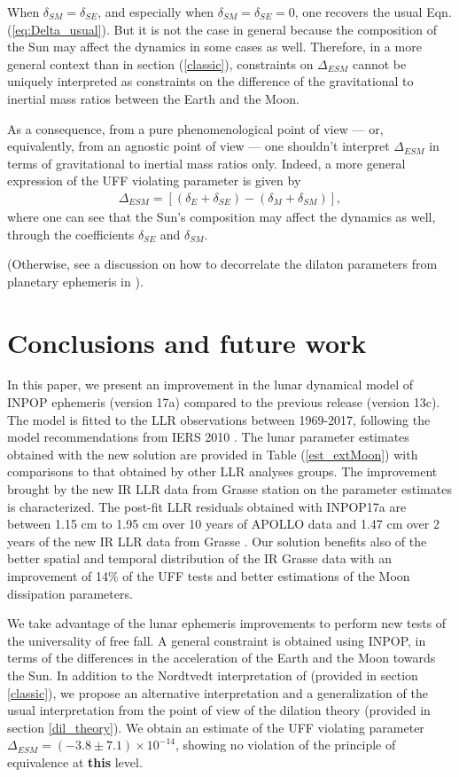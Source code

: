 \documentclass[fleqn,usenatbib,referee]{mnras}
\begin{document}
When $\delta_{SM}=\delta_{SE}$, and especially when $\delta_{SM}=\delta_{SE}=0$, one recovers the usual Eqn. (\ref{eq:Delta_usual}). But it is not the case in general because the composition of the Sun may affect the dynamics in some cases as well. Therefore, in a more general context than in section (\ref{classic}), constraints on $\Delta_{ESM}$ cannot be uniquely interpreted as constraints on the difference of the gravitational to inertial mass ratios between the Earth and the Moon. 

As a consequence, from a pure phenomenological point of view --- or, equivalently, from an agnostic point of view --- one shouldn't interpret $\Delta_{ESM}$ in terms of gravitational to inertial mass ratios only. Indeed, a more general expression of the UFF violating parameter is given by
\begin{eqnarray}
\Delta_{ESM} =\left[(\delta_E+\delta_{SE})- (\delta_M+\delta_{SM}) \right],\label{eq:Delta_dilaton}
\end{eqnarray}
where one can see that the Sun's composition may affect the dynamics as well, through the coefficients $\delta_{SE}$ and $\delta_{SM}$. 

(Otherwise, see a discussion on how to decorrelate the dilaton parameters from planetary ephemeris in \cite[]{2017arXiv170505244M}).


\section{Conclusions and future work}
In this paper, we present an improvement in the lunar dynamical model of INPOP ephemeris (version 17a) compared to the previous release (version 13c). The model is fitted to the LLR observations between 1969-2017, following the model recommendations from IERS 2010 \cite[]{IERS2010}. The lunar parameter estimates obtained with the new solution are provided in Table (\ref{est_extMoon}) with comparisons to that obtained by other LLR analyses groups. The improvement brought by the new IR LLR data from Grasse station on the parameter estimates is characterized. The post-fit LLR residuals obtained with INPOP17a are between 1.15 cm to 1.95 cm over 10 years of APOLLO data and 1.47 cm over 2 years of the new IR LLR data from Grasse \cite[]{Viswanathan2017a}.
Our solution benefits also of the better spatial and temporal distribution of the IR Grasse data with an improvement of 14$\%$ of the UFF tests and better estimations of the Moon dissipation parameters.

We take advantage of the lunar ephemeris improvements to perform new tests of the universality of free fall. A general constraint is obtained using INPOP, in terms of the differences in the acceleration of the Earth and the Moon towards the Sun. In addition to the Nordtvedt interpretation of \cite{1968PhRv..170.1186N} (provided in section \ref{classic}), we propose an alternative interpretation and a generalization of the usual interpretation from the point of view of the dilation theory \cite[]{damour:1994np,hees:2015ax,minazzoli:2016pr} (provided in section \ref{dil_theory}). We obtain an estimate of the UFF violating parameter $\Delta_{ESM} = (-3.8 \pm 7.1) \times10^{-14}$, showing no violation of the principle of equivalence at \textbf{this} level.
\end{document}
